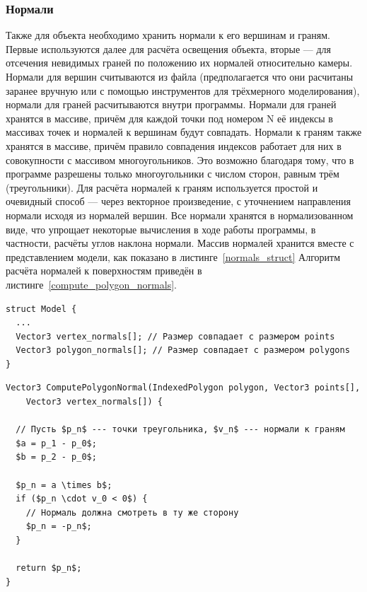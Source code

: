 \documentclass[a4paper,12pt]{report}
\numberwithin{equation}{section}
\begin{document}

\subsubsection{Нормали}
Также для объекта необходимо хранить нормали к его вершинам и граням. Первые используются далее для расчёта освещения объекта, вторые --- для отсечения невидимых граней по положению их нормалей относительно камеры. Нормали для вершин считываются из файла (предполагается что они расчитаны заранее вручную или с помощью инструментов для трёхмерного моделирования), нормали для граней расчитываются внутри программы. Нормали для граней хранятся в массиве, причём для каждой точки под номером N её индексы в массивах точек и нормалей к вершинам будут совпадать. Нормали к граням также хранятся в массиве, причём правило совпадения индексов работает для них в совокупности с массивом многоугольников. Это возможно благодаря тому, что в программе разрешены только многоугольники с числом сторон, равным трём (треугольники). Для расчёта нормалей к граням используется простой и очевидный способ --- через векторное произведение, с уточнением направления нормали исходя из нормалей вершин. Все нормали хранятся в нормализованном виде, что упрощает некоторые вычисления в ходе работы программы, в частности, расчёты углов наклона нормали. Массив нормалей хранится вместе с представлением модели, как показано в листинге~\ref{normals_struct} Алгоритм расчёта нормалей к поверхностям приведён в листинге~\ref{compute_polygon_normals}.

\begin{lstlisting}[float=p,caption={Структура данных ``Модель'' с добавленными полями нормалей},label=normals_struct]
struct Model {
  ...
  Vector3 vertex_normals[]; // Размер совпадает с размером points
  Vector3 polygon_normals[]; // Размер совпадает с размером polygons
}
\end{lstlisting}

\begin{lstlisting}[float=p,caption={Расчёт нормали к поверхности},label=compute_polygon_normals]
Vector3 ComputePolygonNormal(IndexedPolygon polygon, Vector3 points[],
    Vector3 vertex_normals[]) {
  
  // Пусть $p_n$ --- точки треугольника, $v_n$ --- нормали к граням
  $a = p_1 - p_0$;
  $b = p_2 - p_0$;
  
  $p_n = a \times b$;
  if ($p_n \cdot v_0 < 0$) {
    // Нормаль должна смотреть в ту же сторону
    $p_n = -p_n$;
  }
  
  return $p_n$;
}
\end{lstlisting}
\end{document}
